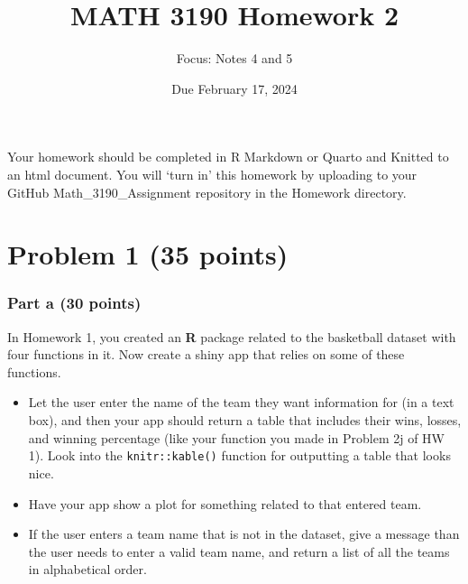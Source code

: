 \documentclass[
]{article}
\title{MATH 3190 Homework 2}
\author{Focus: Notes 4 and 5}
\date{Due February 17, 2024}
\begin{document}
\maketitle

Your homework should be completed in R Markdown or Quarto and Knitted to
an html document. You will `turn in' this homework by uploading to your
GitHub Math\_3190\_Assignment repository in the Homework directory.

\hypertarget{problem-1-35-points}{%
\section{Problem 1 (35 points)}\label{problem-1-35-points}}

\hypertarget{part-a-30-points}{%
\subsubsection{Part a (30 points)}\label{part-a-30-points}}

In Homework 1, you created an \textbf{R} package related to the
basketball dataset with four functions in it. Now create a shiny app
that relies on some of these functions.

\begin{itemize}
\item
  Let the user enter the name of the team they want information for (in
  a text box), and then your app should return a table that includes
  their wins, losses, and winning percentage (like your function you
  made in Problem 2j of HW 1). Look into the \texttt{knitr::kable()}
  function for outputting a table that looks nice.
\item
  Have your app show a plot for something related to that entered team.
\item
  If the user enters a team name that is not in the dataset, give a
  message than the user needs to enter a valid team name, and return a
  list of all the teams in alphabetical order.
\end{itemize}
\end{document}
